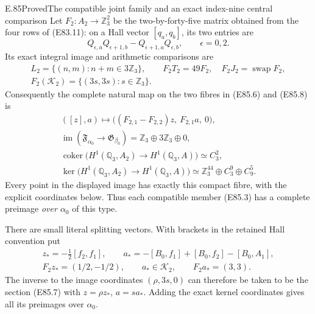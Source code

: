 \begin{statement}{E.85}{Proved}{The compatible joint family and an exact index-nine central comparison}
Let $F_2:A_2\to\mathbb Z_3^2$ be the two-by-forty-five
matrix obtained from the four rows of (E83.11): on
a Hall vector $[q_a,q_b]$, its two entries are
\[
 Q_{\epsilon,a}Q_{\epsilon+1,b}
       -Q_{\epsilon+1,a}Q_{\epsilon,b},\qquad \epsilon=0,2.
 \tag{E85.10}
\]
Its exact integral image and arithmetic comparisons are
\[
 \begin{gathered}
 L_2=\{(n,m):n+m\in3\mathbb Z_3\},\qquad
 F_2T_2=49F_2,\quad F_2J_2=\operatorname{swap}F_2,\\
 F_2(\mathcal K_2)=\{(3s,3s):s\in\mathbb Z_3\}.
 \end{gathered}
 \tag{E85.11}
\]
Consequently the complete natural map on the two
fibres in (E85.6) and (E85.8) is
\[
 \begin{gathered}
 ([z],a)\longmapsto
       \bigl((F_{2,1}-F_{2,2})z,\ F_{2,1}a,\ 0\bigr),\\
 \operatorname{im}(\mathfrak F_{\alpha_0}\to\mathfrak G_{\beta_0})
       =\mathbb Z_3\oplus3\mathbb Z_3\oplus0,\\
 \operatorname{coker}
       \bigl(H^1(\mathbb Q_3,A_2)\to H^1(\mathbb Q_3,A)\bigr)
       \simeq C_3^2,\\
 \ker\bigl(H^1(\mathbb Q_3,A_2)\to H^1(\mathbb Q_3,A)\bigr)
       \simeq\mathbb Z_3^{44}\oplus C_3^9\oplus C_9^5.
 \end{gathered}
 \tag{E85.12}
\]
Every point in the displayed image has exactly this
compact fibre, with the explicit coordinates below.
Thus each compatible member (E85.3) has a complete
preimage \emph{over $\alpha_0$} of this type.

There are small literal splitting vectors. With
brackets in the retained Hall convention put
\[
 \begin{gathered}
 z_*=-\tfrac12[f_2,f_1],\qquad
 a_*=-[B_0,f_1]+[B_0,f_2]-[B_0,A_1],\\
 F_2z_*=(1/2,-1/2),\qquad
 a_*\in\mathcal K_2,\qquad F_2a_*=(3,3).
 \end{gathered}
 \tag{E85.13}
\]
The inverse to the image coordinates $(\rho,3s,0)$
can therefore be taken to be the section (E85.7)
with $z=\rho z_*$, $a=s a_*$. Adding the exact
kernel coordinates gives all its preimages over
$\alpha_0$.


\end{statement}
